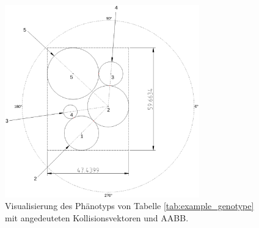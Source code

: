 \documentclass[twoside,bibtotoc]{report}
\begin{document}
\begin{table}[h]
\caption{
 	Beispielhafte Darstellung eines Individuums mit $n = 5$ in Genotyp und dekodiertem Phänotyp.
 	}
 \label{tab:example_genotype}
\end{table}

\begin{figure}[h]
 \centering
 \includegraphics [width=0.75\textwidth]{Bilder/3.png}
 \caption{
 	Visualisierung des Phänotyps von Tabelle \ref{tab:example_genotype}
 	mit angedeuteten Kollisionsvektoren und \gls{AABB}.
 	}
 \label{fig:genotype}
\end{figure}
\end{document}
